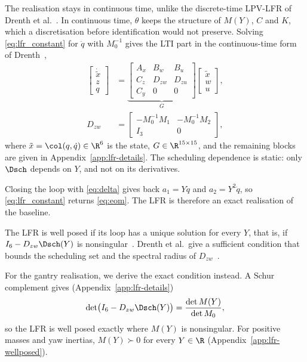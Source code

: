 The realisation stays in continuous time, unlike the discrete-time LPV-LFR
of Drenth et al.~\cite[Sec.~3.1]{drenth2025lpvlfr}.
In continuous time, $\theta$ keeps the structure of $M(Y)$, $C$ and $K$,
which a discretisation before identification would not preserve.
Solving \eqref{eq:lfr_constant} for $\ddot q$ with $M_0^{-1}$ gives the LTI
part in the continuous-time form of Drenth~\cite[Eqs.~(2.1), (2.2)]{drenth2025thesis},
{\small
\begin{equation}
\begin{aligned}
  \begin{bmatrix}\dot{\tilde x}\\ z\\ q\end{bmatrix}
  &=\underbrace{\begin{bmatrix}
    A_x&B_w&B_u\\ C_z&D_{zw}&D_{zu}\\ C_y&0&0
  \end{bmatrix}}_{G}
  \begin{bmatrix}\tilde x\\ w\\ u\end{bmatrix},\\
  D_{zw}&=\begin{bmatrix}-M_0^{-1}M_1&-M_0^{-1}M_2\\ I_3&0\end{bmatrix},
\end{aligned}
  \label{eq:lfr_G}
\end{equation}
}
where $\tilde x=\col(q,\dot q)\in\R^6$ is the state, $G\in\R^{15\times15}$,
and the remaining blocks are given in Appendix~\ref{app:lfr-details}.
The scheduling dependence is static: only $\Dsch$ depends on $Y$, and not
on its derivatives.

Closing the loop with \eqref{eq:delta} gives back $a_1=Y\ddot q$ and
$a_2=Y^2\ddot q$, so \eqref{eq:lfr_constant} returns \eqref{eq:eom}.
The LFR is therefore an exact realisation of the baseline.

The LFR is well posed if its loop has a unique solution for every $Y$, that
is, if $I_6-D_{zw}\Dsch(Y)$ is nonsingular~\cite[Sec.~2.1]{drenth2025thesis}.
Drenth et al.\ give a sufficient condition that bounds the scheduling set and
the spectral radius of $D_{zw}$~\cite[Thm.~6]{drenth2025lpvlfr}.

For the gantry realisation, we derive the exact condition instead.
A Schur complement gives (Appendix~\ref{app:lfr-details})
\begin{equation}
  \det\bigl(I_6-D_{zw}\Dsch(Y)\bigr)=\frac{\det M(Y)}{\det M_0},
  \label{eq:wellposed}
\end{equation}
so the LFR is well posed exactly where $M(Y)$ is nonsingular.
For positive masses and yaw inertias, $M(Y)\succ0$ for every
$Y\in\R$ (Appendix~\ref{app:lfr-wellposed}).

